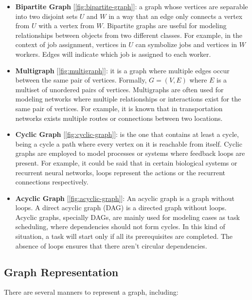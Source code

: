 \documentclass[../Thesis.tex]{subfiles}
\begin{document}
\begin{itemize}
		\item \textbf{Bipartite Graph} [\autoref{fig:bipartite-graph}]: a graph whose vertices are separable into two disjoint sets \( U \) and \( W \) in a way that an edge only connects a vertex from \( U \) with a vertex from \( W \). Bipartite graphs are useful for modeling relationships between objects from two different classes. For example, in the context of job assignment, vertices in \( U \) can symbolize jobs and vertices in  \( W \) workers.  Edges will indicate which job is assigned to each worker.
		
		
		\item \textbf{Multigraph} [\autoref{fig:multigraph}]: it is a graph where multiple edges occur between the same pair of vertices. Formally, \( G = (V, E) \) where \( E \)  is a multiset of unordered pairs of vertices. Multigraphs are often used for modeling networks where multiple relationships or interactions exist for the same pair of vertices. For example, it is known that in transportation networks exists multiple routes or connections between two locations.
		
		
		\item \textbf{Cyclic Graph} [\autoref{fig:cyclic-graph}]: is the one that contains at least a cycle, being a cycle a path where every vertex on it is reachable from itself. Cyclic graphs are employed to model processes or systems where feedback loops are present. For example, it could be said that in certain biological systems or recurrent neural networks, loops represent the actions or the recurrent connections respectively.
		
		
		\item \textbf{Acyclic Graph} [\autoref{fig:acyclic-graph}]: An acyclic graph is a graph without loops. A direct acyclic graph (DAG) is a directed graph without loops. Acyclic graphs, specially DAGs, are mainly used for modeling cases as task scheduling, where dependencies should not form cycles. In this kind of situation, a task will start only if all its prerequisites are completed. The absence of loops ensures that there aren't circular dependencies.
		
		
	\end{itemize}
	
	\subsection{Graph Representation}
	There are several manners to represent a graph, including:
	
\end{document}
